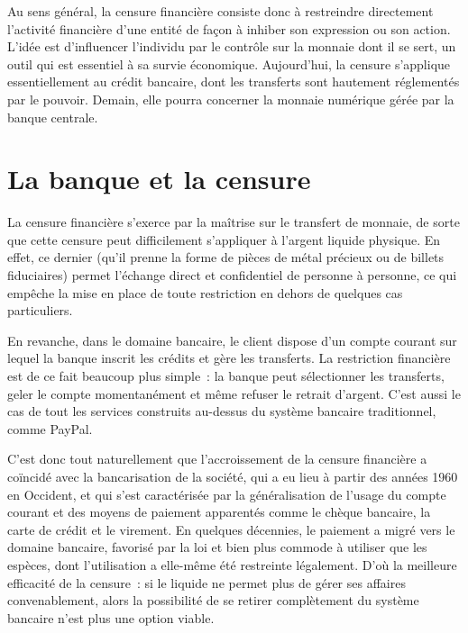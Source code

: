 Au sens général, la censure financière consiste donc à restreindre directement l'activité financière d'une entité de façon à inhiber son expression ou son action. L'idée est d'influencer l'individu par le contrôle sur la monnaie dont il se sert, un outil qui est essentiel à sa survie économique. Aujourd'hui, la censure s'applique essentiellement au crédit bancaire, dont les transferts sont hautement réglementés par le pouvoir. Demain, elle pourra concerner la monnaie numérique gérée par la banque centrale.

\section*{La banque et la censure}

La censure financière s'exerce par la maîtrise sur le transfert de monnaie, de sorte que cette censure peut difficilement s'appliquer à l'argent liquide physique. En effet, ce dernier (qu'il prenne la forme de pièces de métal précieux ou de billets fiduciaires) permet l'échange direct et confidentiel de personne à personne, ce qui empêche la mise en place de toute restriction en dehors de quelques cas particuliers.

En revanche, dans le domaine bancaire, le client dispose d'un compte courant sur lequel la banque inscrit les crédits et gère les transferts. La restriction financière est de ce fait beaucoup plus simple~: la banque peut sélectionner les transferts, geler le compte momentanément et même refuser le retrait d'argent. C'est aussi le cas de tout les services construits au-dessus du système bancaire traditionnel, comme PayPal.

C'est donc tout naturellement que l'accroissement de la censure financière a coïncidé avec la bancarisation de la société, qui a eu lieu à partir des années 1960 en Occident, et qui s'est caractérisée par la généralisation de l'usage du compte courant et des moyens de paiement apparentés comme le chèque bancaire, la carte de crédit et le virement. En quelques décennies, le paiement a migré vers le domaine bancaire, favorisé par la loi et bien plus commode à utiliser que les espèces, dont l'utilisation a elle-même été restreinte légalement. D'où la meilleure efficacité de la censure~: si le liquide ne permet plus de gérer ses affaires convenablement, alors la possibilité de se retirer complètement du système bancaire n'est plus une option viable.

